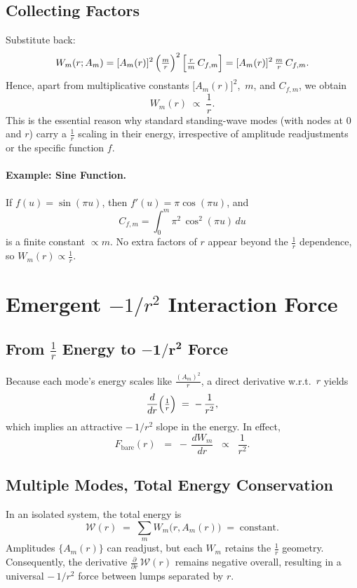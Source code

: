 \documentclass[12pt]{article}
\begin{document}
\subsection{Collecting Factors}
Substitute back:
\[
W_m(r; A_m)
=
[A_m(r)]^2
\,
\Bigl(\tfrac{m}{r}\Bigr)^2
\,
\Bigl[\tfrac{r}{m}\,C_{f,m}\Bigr]
=
[A_m(r)]^2 \,
\tfrac{m}{r}\,
C_{f,m}.
\]
Hence, apart from multiplicative constants \(\bigl[A_m(r)\bigr]^2\), \(\,m\), and \(C_{f,m}\), we obtain
\[
W_m(r) \;\propto\;\frac{1}{r}.
\]
This is the essential reason why standard standing-wave modes (with nodes at 0 and \(r\)) carry a \(\frac{1}{r}\) scaling in their energy, irrespective of amplitude readjustments or the specific function \(f\). 

\paragraph{Example: Sine Function.}
If \(f(u)=\sin(\pi u)\), then \(f'(u)=\pi\cos(\pi u)\), and
\[
C_{f,m}
=
\int_{0}^{m}
\pi^2\,\cos^2(\pi u)\,du
\]
is a finite constant \(\propto m\). No extra factors of \(r\) appear beyond the \(\tfrac{1}{r}\) dependence, so \(W_m(r)\propto \tfrac{1}{r}\).

\section{Emergent \texorpdfstring{$-\!1/r^2$}{-1/r\^2} Interaction Force}

\subsection{From \(\tfrac{1}{r}\) Energy to \(\boldsymbol{-\!1/r^2}\) Force}
Because each mode’s energy scales like \(\tfrac{(A_m)^2}{r}\), a direct derivative w.r.t.\ \(r\) yields
\[
\frac{d}{dr}\Bigl(\tfrac{1}{r}\Bigr)
\;=\;
-\,\frac{1}{r^{2}},
\]
which implies an attractive \(-\,1/r^2\) slope in the energy. In effect,
\[
F_{\text{bare}}(r)
\;\;=\;
-\,\frac{dW_m}{dr}
\;\;\propto\;\;\frac{1}{r^2}.
\]

\subsection{Multiple Modes, Total Energy Conservation}
In an isolated system, the total energy is
\[
\mathcal{W}(r)
\;=\;
\sum_{m} W_m\bigl(r, A_m(r)\bigr)
\;=\;
\text{constant}.
\]
Amplitudes \(\{A_m(r)\}\) can readjust, but each \(W_m\) retains the \(\tfrac{1}{r}\) geometry. Consequently, the derivative \(\tfrac{\partial}{\partial r}\,\mathcal{W}(r)\) remains negative overall, resulting in a universal \(-\,1/r^2\) force between lumps separated by \(r\).  
\end{document}
